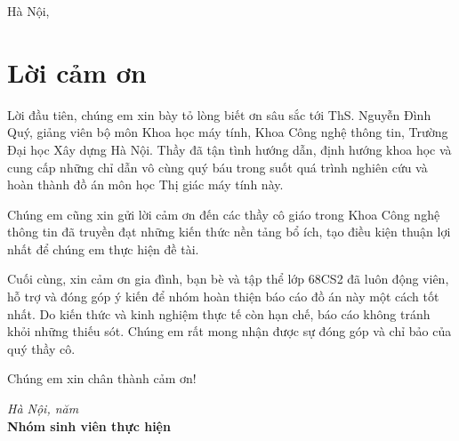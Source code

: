 \documentclass[12pt,a4paper]{article}
\begin{document}
\begin{titlepage}
\begin{center}
    \vfill
    
    {\large Hà Nội, \the\year}
  \end{center}
\end{titlepage}

\newpage
\section*{Lời cảm ơn}
Lời đầu tiên, chúng em xin bày tỏ lòng biết ơn sâu sắc tới ThS. Nguyễn Đình Quý, giảng viên bộ môn Khoa học máy tính, Khoa Công nghệ thông tin, Trường Đại học Xây dựng Hà Nội. Thầy đã tận tình hướng dẫn, định hướng khoa học và cung cấp những chỉ dẫn vô cùng quý báu trong suốt quá trình nghiên cứu và hoàn thành đồ án môn học Thị giác máy tính này.

Chúng em cũng xin gửi lời cảm ơn đến các thầy cô giáo trong Khoa Công nghệ thông tin đã truyền đạt những kiến thức nền tảng bổ ích, tạo điều kiện thuận lợi nhất để chúng em thực hiện đề tài. 

Cuối cùng, xin cảm ơn gia đình, bạn bè và tập thể lớp 68CS2 đã luôn động viên, hỗ trợ và đóng góp ý kiến để nhóm hoàn thiện báo cáo đồ án này một cách tốt nhất. Do kiến thức và kinh nghiệm thực tế còn hạn chế, báo cáo không tránh khỏi những thiếu sót. Chúng em rất mong nhận được sự đóng góp và chỉ bảo của quý thầy cô.

Chúng em xin chân thành cảm ơn!
\begin{flushright}
  \textit{Hà Nội, năm \the\year}\\
  \textbf{Nhóm sinh viên thực hiện}
\end{flushright}

\newpage

\tableofcontents
\newpage
\listoffigures
{}
\newpage
\listoftables
{}
\newpage

\printglossary[type=\acronymtype, title={Danh mục từ viết tắt}]
\newpage


\newpage

\newpage

\newpage

\newpage

\newpage

\newpage

\newpage

\newpage


\newpage
\begingroup
\sloppy
\printbibliography[title={Tài liệu tham khảo}]
\endgroup
{}

\newpage

\end{document}
